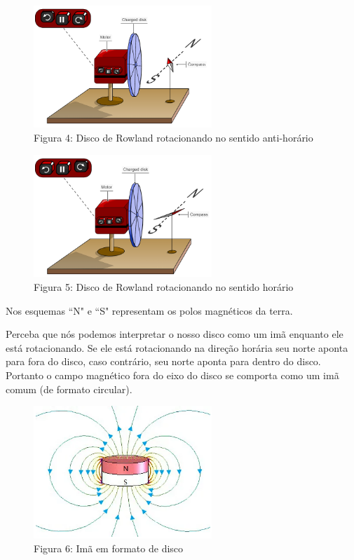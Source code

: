 \documentclass[12pt, letterpaper]{article}
\begin{document}
    \begin{figure}[h]
        \centering
        \includegraphics[width=0.6\textwidth]{counter_clockwise}
        \\{Figura 4: Disco de Rowland rotacionando no sentido anti-horário}
        \label{fig:counterclockwise}
    \end{figure}
    \begin{figure}[H]
        \centering
        \includegraphics[width=0.6\textwidth]{clockwise}
        \\{Figura 5: Disco de Rowland rotacionando no sentido horário}
        \label{fig:counterclockwise}
    \end{figure}

    Nos esquemas ``N" e ``S" representam os polos magnéticos da terra.

    Perceba que nós podemos interpretar o nosso disco como um imã enquanto ele está rotacionando. Se ele está rotacionando na direção horária seu norte aponta para fora do disco, caso contrário, seu norte aponta para dentro do disco. Portanto o campo magnético fora do eixo do disco se comporta como um imã comum (de formato circular).
    \begin{figure}[h]
        \centering
        \includegraphics[width=0.6\textwidth]{disc}
        \\{Figura 6: Imã em formato de disco}
        \label{fig:counterclockwise}
    \end{figure}
\end{document}
